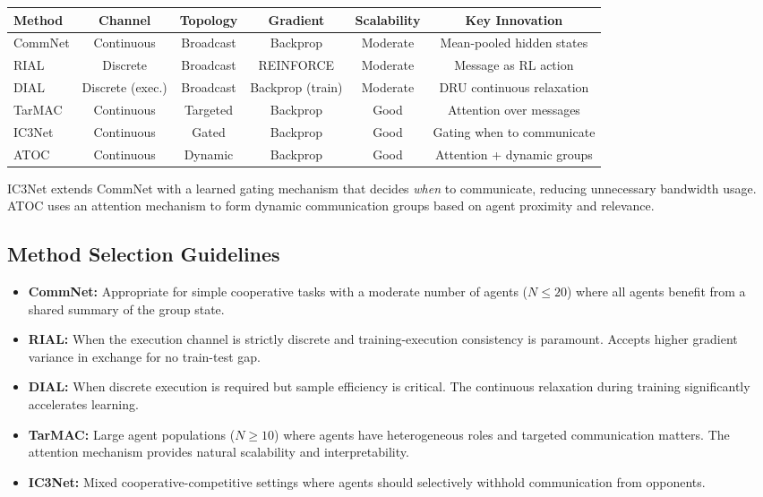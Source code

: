 \documentclass[11pt,a4paper]{article}
\begin{document}
\begin{center}
\small
\begin{tabular}{lccccc}
\toprule
\textbf{Method} & \textbf{Channel} & \textbf{Topology} &
\textbf{Gradient} & \textbf{Scalability} & \textbf{Key
Innovation} \\
\midrule
CommNet & Continuous & Broadcast & Backprop &
  Moderate & Mean-pooled hidden states \\
RIAL & Discrete & Broadcast & REINFORCE &
  Moderate & Message as RL action \\
DIAL & Discrete (exec.) & Broadcast & Backprop (train) &
  Moderate & DRU continuous relaxation \\
TarMAC & Continuous & Targeted & Backprop &
  Good & Attention over messages \\
IC3Net & Continuous & Gated & Backprop &
  Good & Gating when to communicate \\
ATOC & Continuous & Dynamic & Backprop &
  Good & Attention + dynamic groups \\
\bottomrule
\end{tabular}
\end{center}

\noindent
IC3Net \citep{singh2019} extends CommNet with a learned gating
mechanism that decides \emph{when} to communicate, reducing
unnecessary bandwidth usage.  ATOC \citep{jiang2018} uses an
attention mechanism to form dynamic communication groups based on
agent proximity and relevance.

\subsection{Method Selection Guidelines}

\begin{itemize}[nosep]
  \item \textbf{CommNet:}  Appropriate for simple cooperative
    tasks with a moderate number of agents ($N \leq 20$) where
    all agents benefit from a shared summary of the group state.
  \item \textbf{RIAL:}  When the execution channel is strictly
    discrete and training-execution consistency is paramount.
    Accepts higher gradient variance in exchange for no
    train-test gap.
  \item \textbf{DIAL:}  When discrete execution is required but
    sample efficiency is critical.  The continuous relaxation
    during training significantly accelerates learning.
  \item \textbf{TarMAC:}  Large agent populations ($N \geq 10$)
    where agents have heterogeneous roles and targeted
    communication matters.  The attention mechanism provides
    natural scalability and interpretability.
  \item \textbf{IC3Net:}  Mixed cooperative-competitive settings
    where agents should selectively withhold communication from
    opponents.
\end{itemize}
\end{document}
